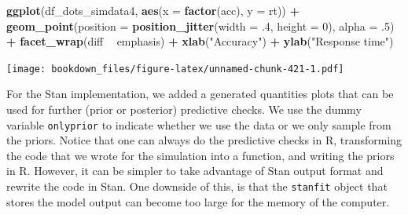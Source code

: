 \documentclass[12pt,]{krantz}
\newenvironment{Shaded}{\begin{snugshade}}{\end{snugshade}}
\newcommand{\DataTypeTok}[1]{\textcolor[rgb]{0.13,0.29,0.53}{#1}}
\newcommand{\DecValTok}[1]{\textcolor[rgb]{0.00,0.00,0.81}{#1}}
\newcommand{\FloatTok}[1]{\textcolor[rgb]{0.00,0.00,0.81}{#1}}
\newcommand{\KeywordTok}[1]{\textcolor[rgb]{0.13,0.29,0.53}{\textbf{#1}}}
\newcommand{\NormalTok}[1]{#1}
\newcommand{\OperatorTok}[1]{\textcolor[rgb]{0.81,0.36,0.00}{\textbf{#1}}}
\newcommand{\StringTok}[1]{\textcolor[rgb]{0.31,0.60,0.02}{#1}}
\theoremstyle{definition}
\theoremstyle{definition}
\theoremstyle{definition}
\theoremstyle{remark}
\begin{document}
\begin{Shaded}
\begin{Highlighting}[]
\KeywordTok{ggplot}\NormalTok{(df_dots_simdata4, }\KeywordTok{aes}\NormalTok{(}\DataTypeTok{x =} \KeywordTok{factor}\NormalTok{(acc), }\DataTypeTok{y =}\NormalTok{ rt)) }\OperatorTok{+}
\StringTok{  }\KeywordTok{geom_point}\NormalTok{(}\DataTypeTok{position =} \KeywordTok{position_jitter}\NormalTok{(}\DataTypeTok{width =} \FloatTok{.4}\NormalTok{, }\DataTypeTok{height =} \DecValTok{0}\NormalTok{),}
             \DataTypeTok{alpha =} \FloatTok{.5}\NormalTok{) }\OperatorTok{+}
\StringTok{  }\KeywordTok{facet_wrap}\NormalTok{(diff }\OperatorTok{~}\StringTok{ }\NormalTok{emphasis) }\OperatorTok{+}
\StringTok{  }\KeywordTok{xlab}\NormalTok{(}\StringTok{"Accuracy"}\NormalTok{) }\OperatorTok{+}
\StringTok{  }\KeywordTok{ylab}\NormalTok{(}\StringTok{"Response time"}\NormalTok{)}
\end{Highlighting}
\end{Shaded}

\texttt{[image: bookdown\_files/figure-latex/unnamed-chunk-421-1.pdf]}

For the Stan implementation, we added a generated quantities plots that can be used for further (prior or posterior) predictive checks. We use the dummy variable \texttt{onlyprior} to indicate whether we use the data or we only sample from the priors. Notice that one can always do the predictive checks in R, transforming the code that we wrote for the simulation into a function, and writing the priors in R. However, it can be simpler to take advantage of Stan output format and rewrite the code in Stan. One downside of this, is that the \texttt{stanfit} object that stores the model output can become too large for the memory of the computer.
\end{document}

